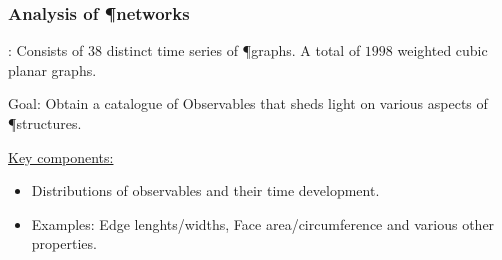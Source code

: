 \documentclass[	hyperref={pdfpagelabels=false}, xcolor=dvipsnames,
		11pt]{beamer}
\begin{document}
\begin{frame}
    \frametitle{Analysis of \P networks} 

	\begin{block}{\data:} 
		Consists of $38$ distinct time series of \P graphs. 
		A total of $1998$ weighted cubic planar graphs.
	\end{block}

	\begin{block}{Goal:} 
		Obtain a catalogue of Observables that sheds light on various aspects of \P structures.
	\end{block}

	\begin{alertblock}{\underline{Key components:}}
	 \begin{itemize}
	  \item Distributions of observables and their time development.
	  \item Examples: Edge lenghts/widths, Face area/circumference and various other properties.
	 \end{itemize}
	\end{alertblock}
\end{frame}
\end{document}
